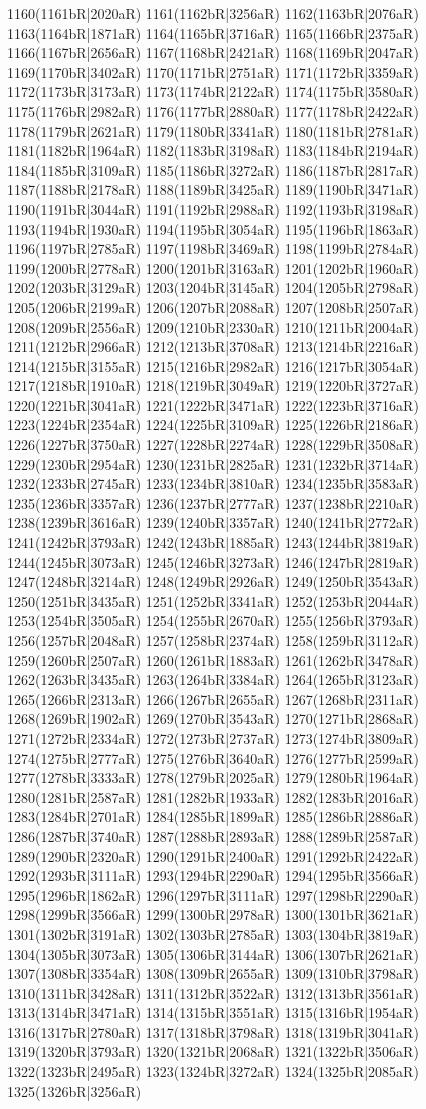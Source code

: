 1160(1161bR|2020aR) 1161(1162bR|3256aR) 1162(1163bR|2076aR) 1163(1164bR|1871aR) 1164(1165bR|3716aR) 1165(1166bR|2375aR) 1166(1167bR|2656aR) 1167(1168bR|2421aR) 1168(1169bR|2047aR) 1169(1170bR|3402aR) 1170(1171bR|2751aR) 1171(1172bR|3359aR) 1172(1173bR|3173aR) 1173(1174bR|2122aR) 1174(1175bR|3580aR) 1175(1176bR|2982aR) 1176(1177bR|2880aR) 1177(1178bR|2422aR) 1178(1179bR|2621aR) 1179(1180bR|3341aR) 1180(1181bR|2781aR) 1181(1182bR|1964aR) 1182(1183bR|3198aR) 1183(1184bR|2194aR) 1184(1185bR|3109aR) 1185(1186bR|3272aR) 1186(1187bR|2817aR) 1187(1188bR|2178aR) 1188(1189bR|3425aR) 1189(1190bR|3471aR) 1190(1191bR|3044aR) 1191(1192bR|2988aR) 1192(1193bR|3198aR) 1193(1194bR|1930aR) 1194(1195bR|3054aR) 1195(1196bR|1863aR) 1196(1197bR|2785aR) 1197(1198bR|3469aR) 1198(1199bR|2784aR) 1199(1200bR|2778aR) 1200(1201bR|3163aR) 1201(1202bR|1960aR) 1202(1203bR|3129aR) 1203(1204bR|3145aR) 1204(1205bR|2798aR) 1205(1206bR|2199aR) 1206(1207bR|2088aR) 1207(1208bR|2507aR) 1208(1209bR|2556aR) 1209(1210bR|2330aR) 1210(1211bR|2004aR) 1211(1212bR|2966aR) 1212(1213bR|3708aR) 1213(1214bR|2216aR) 1214(1215bR|3155aR) 1215(1216bR|2982aR) 1216(1217bR|3054aR) 1217(1218bR|1910aR) 1218(1219bR|3049aR) 1219(1220bR|3727aR) 1220(1221bR|3041aR) 1221(1222bR|3471aR) 1222(1223bR|3716aR) 1223(1224bR|2354aR) 1224(1225bR|3109aR) 1225(1226bR|2186aR) 1226(1227bR|3750aR) 1227(1228bR|2274aR) 1228(1229bR|3508aR) 1229(1230bR|2954aR) 1230(1231bR|2825aR) 1231(1232bR|3714aR) 1232(1233bR|2745aR) 1233(1234bR|3810aR) 1234(1235bR|3583aR) 1235(1236bR|3357aR) 1236(1237bR|2777aR) 1237(1238bR|2210aR) 1238(1239bR|3616aR) 1239(1240bR|3357aR) 1240(1241bR|2772aR) 1241(1242bR|3793aR) 1242(1243bR|1885aR) 1243(1244bR|3819aR) 1244(1245bR|3073aR) 1245(1246bR|3273aR) 1246(1247bR|2819aR) 1247(1248bR|3214aR) 1248(1249bR|2926aR) 1249(1250bR|3543aR) 1250(1251bR|3435aR) 1251(1252bR|3341aR) 1252(1253bR|2044aR) 1253(1254bR|3505aR) 1254(1255bR|2670aR) 1255(1256bR|3793aR) 1256(1257bR|2048aR) 1257(1258bR|2374aR) 1258(1259bR|3112aR) 1259(1260bR|2507aR) 1260(1261bR|1883aR) 1261(1262bR|3478aR) 1262(1263bR|3435aR) 1263(1264bR|3384aR) 1264(1265bR|3123aR) 1265(1266bR|2313aR) 1266(1267bR|2655aR) 1267(1268bR|2311aR) 1268(1269bR|1902aR) 1269(1270bR|3543aR) 1270(1271bR|2868aR) 1271(1272bR|2334aR) 1272(1273bR|2737aR) 1273(1274bR|3809aR) 1274(1275bR|2777aR) 1275(1276bR|3640aR) 1276(1277bR|2599aR) 1277(1278bR|3333aR) 1278(1279bR|2025aR) 1279(1280bR|1964aR) 1280(1281bR|2587aR) 1281(1282bR|1933aR) 1282(1283bR|2016aR) 1283(1284bR|2701aR) 1284(1285bR|1899aR) 1285(1286bR|2886aR) 1286(1287bR|3740aR) 1287(1288bR|2893aR) 1288(1289bR|2587aR) 1289(1290bR|2320aR) 1290(1291bR|2400aR) 1291(1292bR|2422aR) 1292(1293bR|3111aR) 1293(1294bR|2290aR) 1294(1295bR|3566aR) 1295(1296bR|1862aR) 1296(1297bR|3111aR) 1297(1298bR|2290aR) 1298(1299bR|3566aR) 1299(1300bR|2978aR) 1300(1301bR|3621aR) 1301(1302bR|3191aR) 1302(1303bR|2785aR) 1303(1304bR|3819aR) 1304(1305bR|3073aR) 1305(1306bR|3144aR) 1306(1307bR|2621aR) 1307(1308bR|3354aR) 1308(1309bR|2655aR) 1309(1310bR|3798aR) 1310(1311bR|3428aR) 1311(1312bR|3522aR) 1312(1313bR|3561aR) 1313(1314bR|3471aR) 1314(1315bR|3551aR) 1315(1316bR|1954aR) 1316(1317bR|2780aR) 1317(1318bR|3798aR) 1318(1319bR|3041aR) 1319(1320bR|3793aR) 1320(1321bR|2068aR) 1321(1322bR|3506aR) 1322(1323bR|2495aR) 1323(1324bR|3272aR) 1324(1325bR|2085aR) 1325(1326bR|3256aR) 